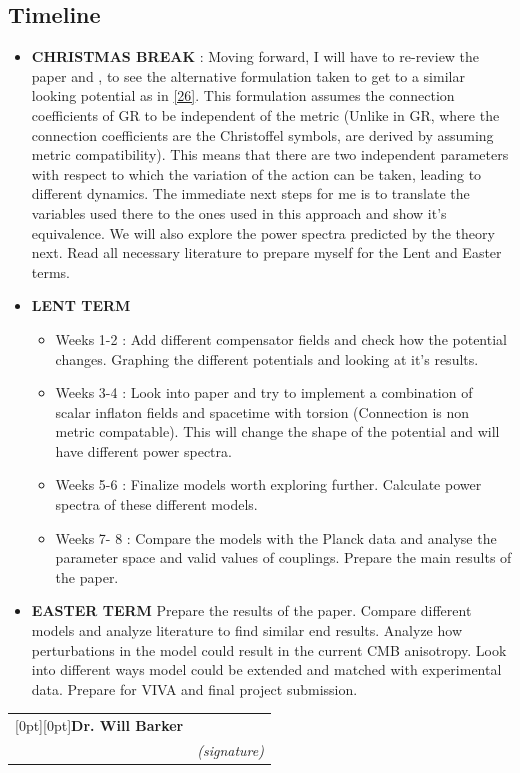 \documentclass[aps,prd,reprint,preprintnumbers,showpacs,floatfix,nofootinbib,superscript address]{revtex4-2}
\newcommand{\signature}[2][8em]{%
  \begin{tabular}[t]{ p{#1} p{#1} }
    \strut\raggedleft
    \raisebox{-.5ex}[0pt][0pt]{\bfseries #2} & \\
    \cline{2-2}
    & \centering\scriptsize\itshape (signature)
  \end{tabular}
}
\begin{document}
\subsection{Timeline}
\begin{itemize}
    \item \textbf{CHRISTMAS BREAK} :
    Moving forward, I will have to re-review the paper \cite{Salvio_2022} and \cite{Blas_2011}, to see the alternative formulation taken to get to a similar looking potential as in \ref{26}. This formulation assumes the connection coefficients of GR to be independent of the metric (Unlike in GR, where the connection coefficients are the Christoffel symbols, are derived by assuming metric compatibility). This means that there are two independent parameters with respect to which the variation of the action can be taken, leading to different dynamics. The immediate next steps for me is to translate the variables used there to the ones used in this approach and show it's equivalence. We will also explore the power spectra predicted by the theory next. Read all necessary literature to prepare myself for the Lent and Easter terms.

    \item \textbf{LENT TERM}
    
    \begin{itemize}
        \item Weeks 1-2 : Add different compensator fields and check how the potential changes. Graphing the different potentials and looking at it's results.
        \item Weeks 3-4 : Look into paper \cite{Salvio_2022} and try to implement a combination of scalar inflaton fields and spacetime with torsion (Connection is non metric compatable). This will change the shape of the potential and will have different power spectra.
        \item Weeks 5-6 : Finalize models worth exploring further. Calculate power spectra of these different models.
        \item Weeks 7- 8 : Compare the models with the Planck data and analyse the parameter space and valid values of couplings. Prepare the main results of the paper.
    \end{itemize}

    \item  \textbf{EASTER TERM} Prepare the results of the paper. Compare different models and analyze literature to find similar end results. Analyze how perturbations in the model could result in the current CMB anisotropy. Look into different ways model could be extended and matched with experimental data. Prepare for VIVA and final project submission.
\end{itemize}



\vspace{5\baselineskip}

\mbox{}\hfill
\signature{Dr. Will Barker}\hfill
\mbox{}

\printbibliography
\end{document}
